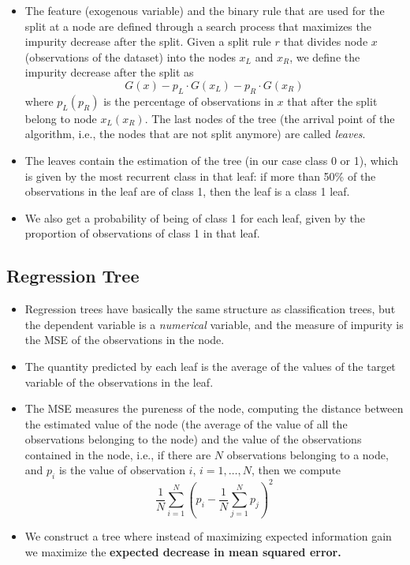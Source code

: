 \begin{itemize}
    \item The feature (exogenous variable) and the binary rule that are used for the split at a node are defined through a search process that maximizes the impurity decrease after the split. Given a split rule $r$ that divides node $x$ (observations of the dataset) into the nodes $x_{L}$ and $x_{R}$, we define the impurity decrease after the split as
    \begin{equation*}
        G\left(x\right) -p_{L} \cdot G\left(x_{L}\right) -p_{R} \cdot G\left(x_{R}\right)
    \end{equation*}
    where $p_{L}(p_{R})$ is the percentage of observations in $x$ that after the split belong to node $x_{L}(x_{R})$. The last nodes of the tree (the arrival point of the algorithm, i.e., the nodes that are not split anymore) are called \textit{leaves}. 
    \item The leaves contain the estimation of the tree (in our case class 0 or 1), which is given by the most recurrent class in that leaf: if more than 50\% of the observations in the leaf are of class 1, then the leaf is a class 1 leaf.
    \item We also get a probability of being of class 1 for each leaf, given by the proportion of observations of class 1 in that leaf.
\end{itemize}

\subsection{Regression Tree}

\begin{itemize}
    \item Regression trees have basically the same structure as classification trees, but the dependent variable is a \emph{numerical} variable, and the measure of impurity is the MSE of the observations in the node. 
    \item The quantity predicted by each leaf is the average of the values of the target variable of the observations in the leaf.
    \item The MSE measures the pureness of the node, computing the distance between the estimated value of the node (the average of the value of all the observations belonging to the node) and the value of the observations contained in the node, i.e., if there are $N$ observations belonging to a node, and $p_i$ is the value of observation $i$, $i=1,\dotsc,N$, then we compute
          \begin{equation*}
              \frac{1}{N}\sum\limits _{i=1}^{N}\left(p_{i} -\frac{1}{N}\sum\limits _{j=1}^{N} p_{j}\right)^{2}
          \end{equation*}
    \item We construct a tree where instead of maximizing expected information gain we maximize the \textbf{expected decrease in mean squared error.}
\end{itemize}

